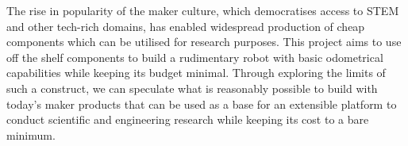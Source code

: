 
The rise in popularity of the maker culture, which democratises access to STEM and other tech-rich domains, 
has enabled widespread production of cheap components which can be utilised for research purposes.
This project aims to use off the shelf components to build a rudimentary robot with basic odometrical 
capabilities while keeping its budget minimal. 
Through exploring the limits of such a construct, we can speculate what is reasonably possible to build with 
today's maker products that can be used as a base for an extensible platform to conduct scientific and engineering 
research while keeping its cost to a bare minimum.
